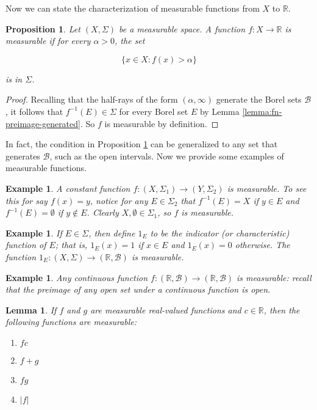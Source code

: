 \documentclass{amsart}
\newcommand{\bbR}{\mathbb{R}}
\newcommand{\Borel}{\mathcal{B}}
\newtheorem{lemma}[theorem]{Lemma}
\newtheorem{proposition}[theorem]{Proposition}
\newtheorem{example}[theorem]{Example}
\begin{document}
Now we can state the characterization of measurable functions from $X$ to $\bbR$.

\begin{proposition}\label{prop:measurable-fn-r}
    Let $(X, \Sigma)$ be a measurable space. A function $f:X \rightarrow \bbR$
    is measurable if for every $\alpha > 0$, the set

    $$\{x \in X : f(x) > \alpha \}$$

    is in $\Sigma$.
\end{proposition}
\begin{proof}
   Recalling that the half-rays of the form $(\alpha, \infty)$ generate the
   Borel sets $\Borel$, it follows that $f^{-1}(E) \in \Sigma$ for every Borel
   set $E$ by Lemma \ref{lemma:fn-preimage-generated}. So $f$ is measurable by definition.
\end{proof}

In fact, the condition in Proposition \ref{prop:measurable-fn-r} can be
generalized to any set that generates $\Borel$, such as the open intervals. Now
we provide some examples of measurable functions.

\begin{example}
    A constant function $f:(X,\Sigma_1) \rightarrow (Y, \Sigma_2)$ is
    measurable. 
    To see this for say $f(x) = y$, notice for any $E \in \Sigma_2$ that
    $f^{-1}(E) = X$ if $y \in E$ and $f^{-1}(E) = \emptyset$ if $y \notin E$.
    Clearly $X,\emptyset \in \Sigma_1$, so $f$ is measurable.
\end{example}

\begin{example}
    If $E \in \Sigma$, then define $1_E$ to be the indicator (or characteristic)
    function of $E$; that is, $1_E(x) = 1$ if $x \in E$ and $1_E(x) = 0$
    otherwise. 
    The function $1_E : (X, \Sigma) \rightarrow (\bbR, \Borel)$
    is measurable.
\end{example}

\begin{example}
    Any continuous function $f: (\bbR, \Borel) \rightarrow (\bbR, \Borel)$ is
    measurable: recall that the preimage of any open set under a continuous
    function is open.
\end{example}

\begin{lemma}
    If $f$ and $g$ are measurable real-valued functions and $c \in \bbR$, then
    the following functions are measurable:
    \begin{enumerate}
        \item $fc$
        \item $f + g$
        \item $fg$
        \item $|f|$
    \end{enumerate}
\end{lemma}
\end{document}
